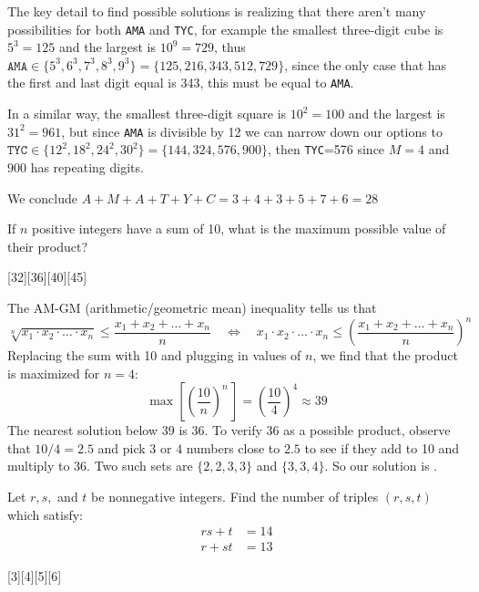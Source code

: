 \begin{solution}[D]
    The key detail to find possible solutions is realizing that there aren't many possibilities for both \texttt{AMA} and \texttt{TYC}, for example the smallest three-digit cube is $5^3=125$ and the largest is $10^9=729$, thus $\texttt{AMA} \in \{ 5^3,6^3,7^3,8^3,9^3\}= \{ 125,216,343,512,729\}$, since the only case that has the first and last digit equal is 343, this must be equal to \texttt{AMA}.
    
    In a similar way, the smallest three-digit square is $10^2=100$ and the largest is $31^2=961$, but since \texttt{AMA} is divisible by 12 we can narrow down our options to $\texttt{TYC} \in \{12^2,18^2,24^2,30^2 \} = \{144,324,576,900 \}$, then \texttt{TYC}=576 since $M=4$ and $900$ has repeating digits.
    
    We conclude $ A + M + A + T + Y + C =3+4+3+5+7+6= \boxed{28} $
\end{solution}

\begin{problem}
    If \( n \) positive integers have a sum of 10, what is the maximum possible value of their product?
\end{problem}
[32][36][40][45]

\begin{solution}[C]
    The AM-GM (arithmetic/geometric mean) inequality tells us that
    \[
        \sqrt[n]{x_1 \cdot x_2 \cdot \dots \cdot x_n} \leq \frac{x_1 + x_2 + \dots + x_n}{n} \quad \iff \quad x_1 \cdot x_2 \cdot \dots \cdot x_n \leq \left(\frac{x_1 + x_2 + \dots + x_n}{n}\right)^{\!\!n}
    \]
    Replacing the sum with 10 and plugging in values of $n$, we find that the product is maximized for $n=4$:
    \[
    \max\!\left[ \left(\frac{10} {n}\right)^{\!\!n}\, \right] =\displaystyle \left(\frac{10} {4}\right)^{\!\!4} \approx 39
    \]
    The nearest solution below $39$ is $36$. To verify $36$ as a possible product, observe that $10/4=2.5$ and pick $3$ or $4$ numbers close to $2.5$ to see if they add to 10 and multiply to 36. Two such sets are $\{2,2,3,3\}$ and $\{3,3,4\}$. So our solution is .
\end{solution}

\newpageSol

\begin{problem}[N][4][AMATYC Fall 2007/18]
    Let \( r, s, \) and \( t \) be nonnegative integers. Find the number of triples \( (r, s, t) \) which satisfy:\vspace{-2mm}
    \begin{align*}
        rs + t &= 14 \\
        r + st &= 13
    \end{align*}
\end{problem}\vspace{-3mm}
[3][4][5][6]

